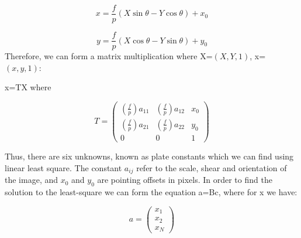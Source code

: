 \documentclass[letterpaper,12pt]{article}
\begin{document}
\begin{equation}
x=\frac{f}{p}(X\sin\theta - Y\cos\theta)+x_{0}

\end{equation}

\begin{equation}
y=\frac{f}{p}(X\cos\theta - Y\sin\theta)+y_{0}

\end{equation}
Therefore, we can form a matrix multiplication where X=\begin{math} (X,Y,1) \end{math}, x=\begin{math} (x,y,1) \end{math}:

x=TX
where

\begin{equation}
T=
\begin{pmatrix}
  (\frac{f}{p})a_{11}  & (\frac{f}{p})a_{12}  & x_{0} \\
  (\frac{f}{p})a_{21}  & (\frac{f}{p})a_{22}  & y_{0} \\
  0 & 0 & 1
 \end{pmatrix}
\end{equation}

Thus, there are six unknowns, known as plate constants which we can find using linear least square. The constant \begin{math} a_{ij} \end{math} refer to the scale, shear and orientation of the image, and \begin{math} x_{0} \end{math} and \begin{math} y_{0} \end{math} are pointing offsets in pixels.
In order to find the solution to the least-square we can form the equation a=Bc, 
where for x we have:

\begin{equation}
a=
\begin{pmatrix}
  x_{1} \\
  x_{2} \\
  x_{N} 
 \end{pmatrix}
\end{equation}
\end{document}
